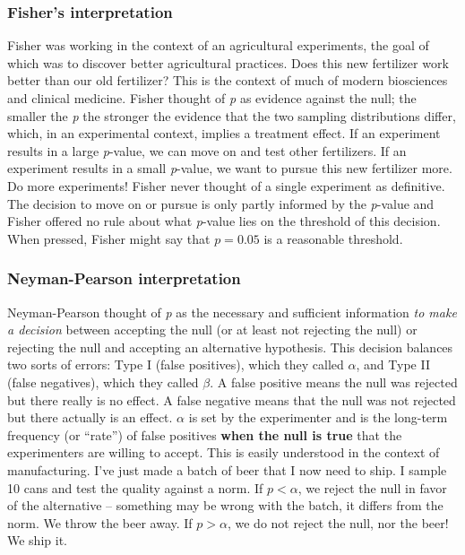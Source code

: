 \documentclass[]{book}
\begin{document}
\hypertarget{fishers-interpretation}{%
\subsubsection{Fisher's interpretation}\label{fishers-interpretation}}

Fisher was working in the context of an agricultural experiments, the goal of which was to discover better agricultural practices. Does this new fertilizer work better than our old fertilizer? This is the context of much of modern biosciences and clinical medicine. Fisher thought of \emph{p} as evidence against the null; the smaller the \emph{p} the stronger the evidence that the two sampling distributions differ, which, in an experimental context, implies a treatment effect. If an experiment results in a large \emph{p}-value, we can move on and test other fertilizers. If an experiment results in a small \emph{p}-value, we want to pursue this new fertilizer more. Do more experiments! Fisher never thought of a single experiment as definitive. The decision to move on or pursue is only partly informed by the \emph{p}-value and Fisher offered no rule about what \emph{p}-value lies on the threshold of this decision. When pressed, Fisher might say that \(p=0.05\) is a reasonable threshold.

\hypertarget{neyman-pearson-interpretation}{%
\subsubsection{Neyman-Pearson interpretation}\label{neyman-pearson-interpretation}}

Neyman-Pearson thought of \emph{p} as the necessary and sufficient information \emph{to make a decision} between accepting the null (or at least not rejecting the null) or rejecting the null and accepting an alternative hypothesis. This decision balances two sorts of errors: Type I (false positives), which they called \(\alpha\), and Type II (false negatives), which they called \(\beta\). A false positive means the null was rejected but there really is no effect. A false negative means that the null was not rejected but there actually is an effect. \(\alpha\) is set by the experimenter and is the long-term frequency (or ``rate'') of false positives \textbf{when the null is true} that the experimenters are willing to accept. This is easily understood in the context of manufacturing. I've just made a batch of beer that I now need to ship. I sample 10 cans and test the quality against a norm. If \(p < \alpha\), we reject the null in favor of the alternative -- something may be wrong with the batch, it differs from the norm. We throw the beer away. If \(p > \alpha\), we do not reject the null, nor the beer! We ship it.
\end{document}

